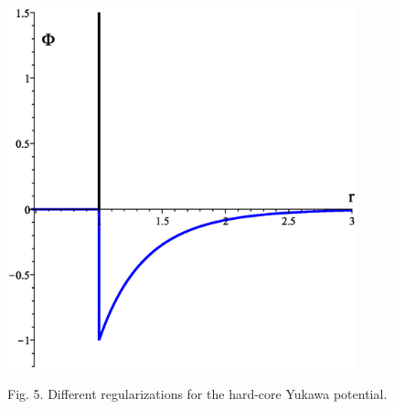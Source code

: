 \documentclass[8pt]{beamer}
\begin{document}
\begin{frame}
\begin{columns}
			\begin{column}{0.5\textwidth}
				\begin{figure}[htbp]
					\includegraphics[width=0.9\textwidth,angle=0]{hcy} \\
					\parbox{0.8\textwidth}{\caption*{Fig. 5. Different regularizations for the hard-core Yukawa potential.
					}}
				\end{figure}
			\end{column}
			
		\end{columns}
		
	\end{frame}
	
\end{document}
